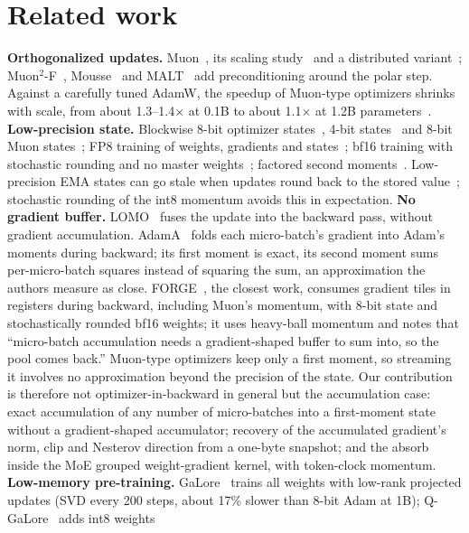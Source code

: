 \documentclass[10pt]{article}
\begin{document}
\section{Related work}
\label{sec:related}
\textbf{Orthogonalized updates.} Muon~\citep{jordan2024muon}, its scaling study~\citep{liu2025muonscalable} and a
distributed variant~\citep{ahn2025dion};
Muon$^2$-F~\citep{liu2026muon2f}, Mousse~\citep{mousse2026} and MALT~\citep{wu2026malt} add preconditioning around the
polar step. Against a carefully tuned AdamW, the speedup of Muon-type optimizers shrinks with scale, from about
1.3--1.4$\times$ at 0.1B to about 1.1$\times$ at 1.2B parameters~\citep{wen2026fantastic}.
\textbf{Low-precision state.} Blockwise 8-bit optimizer states~\citep{dettmers2022eightbit}, 4-bit
states~\citep{li2023fourbit} and 8-bit Muon states~\citep{gupta2025muon8}; FP8 training of weights, gradients and
states~\citep{peng2023fp8lm,xi2024coat}; bf16 training with stochastic rounding and no master
weights~\citep{zamirai2020bf16,ozkara2025sr}; factored second moments~\citep{shazeer2018adafactor}. Low-precision EMA
states can go stale when updates round back to the stored value~\citep{topollai2026staleness}; stochastic rounding of
the int8 momentum avoids this in expectation.
\textbf{No gradient buffer.} LOMO~\citep{lv2024lomo} fuses the update into the backward pass, without gradient
accumulation. AdamA~\citep{adama2023} folds each micro-batch's gradient into Adam's moments during backward; its first
moment is exact, its second moment sums per-micro-batch squares instead of squaring the sum, an approximation the
authors measure as close. FORGE~\citep{forge2026}, the closest work, consumes gradient tiles in registers during
backward, including Muon's momentum, with 8-bit state and stochastically rounded bf16 weights; it uses heavy-ball
momentum and notes that ``micro-batch accumulation needs a gradient-shaped buffer to sum into, so the pool comes
back.'' Muon-type optimizers keep only a first moment, so streaming it involves no approximation beyond the precision of
the state. Our contribution is therefore not optimizer-in-backward in general but the accumulation case: exact
accumulation of any number of micro-batches into a first-moment state without a gradient-shaped accumulator; recovery
of the accumulated gradient's norm, clip and Nesterov direction from a one-byte snapshot; and the absorb inside the
MoE grouped weight-gradient kernel, with token-clock momentum.
\textbf{Low-memory pre-training.} GaLore~\citep{zhao2024galore} trains all weights with low-rank projected updates
(SVD every 200 steps, about 17\% slower than 8-bit Adam at 1B); Q-GaLore~\citep{zhang2024qgalore} adds int8 weights
\end{document}
